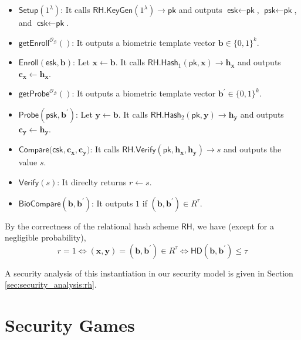 \begin{itemize}

	\item $\textsf{Setup}(1^\lambda)$: It calls $\textsf{RH.KeyGen}(1^\lambda) \to \textsf{pk}$ and outputs $\textsf{esk} \gets \textsf{pk}$, $\textsf{psk} \gets \textsf{pk}$, and $\textsf{csk} \gets \textsf{pk}$.

	\item $\textsf{getEnroll}^{\mathcal{O}_{\mathcal{B}}}()$: It outputs a biometric template vector $\mathbf{b} \in \{0, 1\}^k$.

	\item $\textsf{Enroll}(\textsf{esk}, \mathbf{b})$: Let $\mathbf{x} \gets \mathbf{b}$. It calls $\textsf{RH.Hash}_1(\textsf{pk}, \mathbf{x}) \to \mathbf{h_x}$ and outputs $\mathbf{c_x} \gets \mathbf{h_x}$.

	\item $\textsf{getProbe}^{\mathcal{O}_{\mathcal{B}}}()$: It outputs a biometric template vector $\mathbf{b}^\prime \in \{0, 1\}^k$.

	\item $\textsf{Probe}(\textsf{psk}, \mathbf{b}^\prime)$: Let $\mathbf{y} \gets \mathbf{b}$. It calls $\textsf{RH.Hash}_2(\textsf{pk}, \mathbf{y}) \to \mathbf{h_y}$ and outputs $\mathbf{c_y} \gets \mathbf{h_y}$.

	\item $\textsf{Compare}(\textsf{csk}, \mathbf{c_x}, \mathbf{c_y)}$: It calls $\textsf{RH.Verify}(\textsf{pk}, \mathbf{h_x}, \mathbf{h_y}) \to s$ and outputs the value $s$.

	\item $\textsf{Verify}(s)$: It direclty returns $r \gets s$.

	\item $\textsf{BioCompare}(\mathbf{b}, \mathbf{b}^\prime)$: It outputs $1$ if $(\mathbf{b}, \mathbf{b}^\prime) \in R^\tau$.
\end{itemize}

By the correctness of the relational hash scheme $\textsf{RH}$, we have (except for a negligible probability),
\[
	r = 1 \Leftrightarrow (\mathbf{x}, \mathbf{y}) = (\mathbf{b}, \mathbf{b}^\prime) \in R^\tau \Leftrightarrow \textsf{HD}(\mathbf{b}, \mathbf{b}^\prime) \leq \tau
\]

A security analysis of this instantiation in our security model is given in Section \ref{sec:security_analysis:rh}.



\section{Security Games}
\label{sec:security_game}

